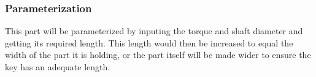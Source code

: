 \subsubsection{Parameterization}
This part will be parameterized by inputing the torque and shaft diameter and getting its required length. This length would then be increased to equal the width of the part it is holding, or the part itself will be made wider to ensure the key has an adequate length.